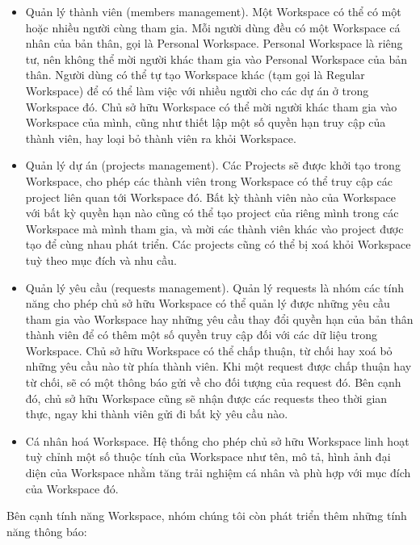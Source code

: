 \begin{itemize}
    \item Quản lý thành viên (members management). Một Workspace có thể có một hoặc nhiều
          người cùng tham gia. Mỗi người dùng đều có một Workspace cá nhân của bản thân,
          gọi là Personal Workspace. Personal Workspace là riêng tư, nên không thể mời
          người khác tham gia vào Personal Workspace của bản thân. Người dùng có thể tự
          tạo Workspace khác (tạm gọi là Regular Workspace) để có thể làm việc với nhiều
          người cho các dự án ở trong Workspace đó. Chủ sở hữu Workspace có thể mời người
          khác tham gia vào Workspace của mình, cũng như thiết lập một số quyền hạn truy
          cập của thành viên, hay loại bỏ thành viên ra khỏi Workspace.
    \item Quản lý dự án (projects management). Các Projects sẽ được khởi tạo trong
          Workspace, cho phép các thành viên trong Workspace có thể truy cập các project
          liên quan tới Workspace đó. Bất kỳ thành viên nào của Workspace với bất kỳ
          quyền hạn nào cũng có thể tạo project của riêng mình trong các Workspace mà
          mình tham gia, và mời các thành viên khác vào project được tạo để cùng nhau
          phát triển. Các projects cũng có thể bị xoá khỏi Workspace tuỳ theo mục đích và
          nhu cầu.
    \item Quản lý yêu cầu (requests management). Quản lý requests là nhóm các tính năng
          cho phép chủ sở hữu Workspace có thể quản lý được những yêu cầu tham gia vào
          Workspace hay những yêu cầu thay đổi quyền hạn của bản thân thành viên để có
          thêm một số quyền truy cập đối với các dữ liệu trong Workspace. Chủ sở hữu
          Workspace có thể chấp thuận, từ chối hay xoá bỏ những yêu cầu nào từ phía thành
          viên. Khi một request được chấp thuận hay từ chối, sẽ có một thông báo gửi về
          cho đối tượng của request đó. Bên cạnh đó, chủ sở hữu Workspace cũng sẽ nhận
          được các requests theo thời gian thực, ngay khi thành viên gửi đi bất kỳ yêu
          cầu nào.
    \item Cá nhân hoá Workspace. Hệ thống cho phép chủ sở hữu Workspace linh hoạt tuỳ
          chỉnh một số thuộc tính của Workspace như tên, mô tả, hình ảnh đại diện của
          Workspace nhằm tăng trải nghiệm cá nhân và phù hợp với mục đích của Workspace
          đó.
\end{itemize}
Bên cạnh tính năng Workspace, nhóm chúng tôi còn phát triển thêm những tính năng thông báo:
